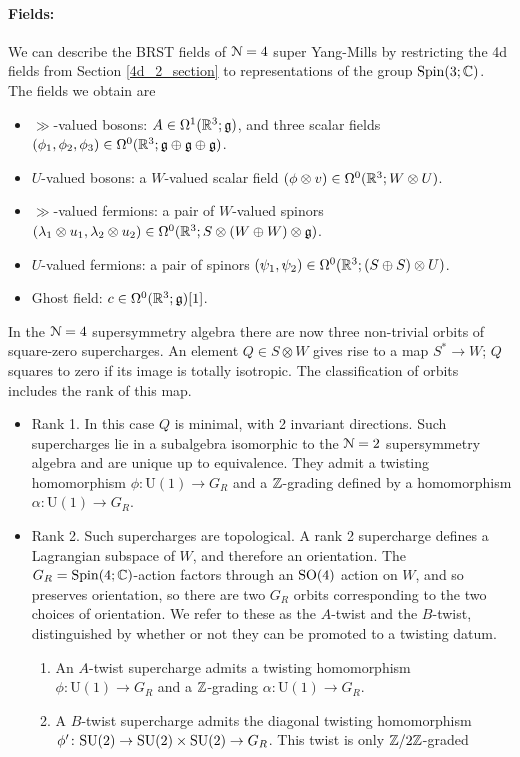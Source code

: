 \documentclass[10pt, oneside]{article}
\renewcommand{\U}{\mathrm{U}}
\begin{document}
\vspace{-10pt}
\paragraph{Fields:}We can describe the BRST fields of $\mathcal{N}=4$ super Yang-Mills by restricting the 4d fields from Section \ref{4d_2_section} to representations of the group $\mathrm{Spin}(3;\mathbb C)$.  The fields we obtain are
\begin{itemize}
 \item $\gg$-valued bosons: $A \in \Omega^1(\mathbb R^3; \mathfrak{g})$, and three scalar fields $(\phi_1,\phi_2,\phi_3) \in \Omega^0(\mathbb R^3; \mathfrak{g} \oplus \mathfrak{g} \oplus \mathfrak{g})$.
 \item $U$-valued bosons: a $W$-valued scalar field $(\phi \otimes v) \in \Omega^0(\mathbb R^3; W \otimes U)$.
 \item $\gg$-valued fermions: a pair of $W$-valued spinors $(\lambda_1 \otimes u_1, \lambda_2 \otimes u_2) \in \Omega^0(\mathbb R^3 ; S \otimes (W \oplus W) \otimes \mathfrak{g})$.
 \item $U$-valued fermions:  a pair of spinors $(\psi_1,\psi_2) \in \Omega^0(\mathbb R^3; (S\oplus S) \otimes U)$.
 \item Ghost field: $c \in \Omega^0(\mathbb R^3; \mathfrak{g})[1]$.
\end{itemize}

In the $\mathcal{N}=4$ supersymmetry algebra there are now three non-trivial orbits of square-zero supercharges.  An element $Q \in S \otimes W$ gives rise to a map $S^* \to W$; $Q$ squares to zero if its image is totally isotropic.  The classification of orbits includes the rank of this map.
\begin{itemize}
 \item Rank 1.  
 In this case $Q$ is minimal, with 2 invariant directions.  
 Such supercharges lie in a subalgebra isomorphic to the $\mathcal{N}=2$ supersymmetry algebra and are unique up to equivalence.
They admit a twisting homomorphism $\phi \colon \U(1) \to G_R$ and a $\mathbb Z$-grading defined by a homomorphism $\alpha \colon \U(1) \to G_R$.
 \item Rank 2. Such supercharges are topological.  
A rank 2 supercharge defines a Lagrangian subspace of $W$, and therefore an orientation.  
The $G_R = \mathrm{Spin}(4;\mathbb C)$-action factors through an $\mathrm{SO}(4)$ action on $W$, and so preserves orientation, so there are two $G_R$ orbits corresponding to the two choices of orientation.  
We refer to these as the $A$-twist and the $B$-twist, distinguished by whether or not they can be promoted to a twisting datum.
\begin{enumerate}
\item
An $A$-twist supercharge admits a twisting homomorphism $\phi \colon \U(1) \to G_R$ and a $\mathbb Z$-grading $\alpha \colon \U(1) \to G_R$.
\item
A $B$-twist supercharge admits the diagonal twisting homomorphism $\phi' \colon \mathrm{SU}(2) \to \mathrm{SU}(2) \times \mathrm{SU}(2) \to G_R$.  
This twist is only $\mathbb Z/2\mathbb Z$-graded
\end{enumerate}
\end{itemize}
\end{document}
